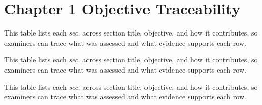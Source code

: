 \section{Chapter 1 Objective Traceability}


\noindent This table lists each \textit{sec.} across section title, objective, and how it contributes, so examiners can trace what was assessed and what evidence supports each row.



\noindent This table lists each \textit{sec.} across section title, objective, and how it contributes, so examiners can trace what was assessed and what evidence supports each row.


\noindent This table lists each \textit{sec.} across section title, objective, and how it contributes, so examiners can trace what was assessed and what evidence supports each row.



